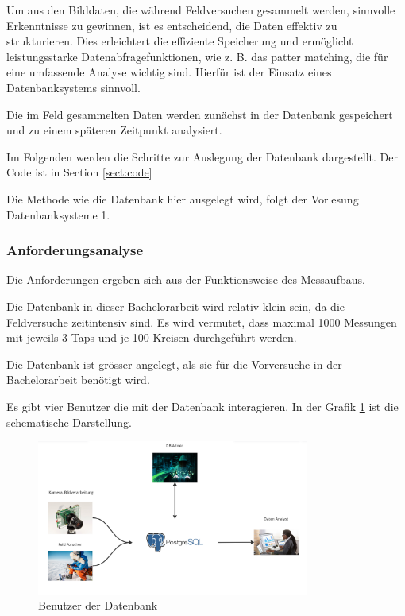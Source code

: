 
Um aus den Bilddaten, die während Feldversuchen gesammelt werden, sinnvolle Erkenntnisse zu gewinnen, ist es entscheidend, die Daten effektiv zu strukturieren. Dies erleichtert die effiziente Speicherung und ermöglicht leistungsstarke Datenabfragefunktionen, wie z. B. das patter matching, die für eine umfassende Analyse wichtig sind. Hierfür ist der Einsatz eines Datenbanksystems sinnvoll.

Die im Feld gesammelten Daten werden zunächst in der Datenbank gespeichert und zu einem späteren Zeitpunkt analysiert.

Im Folgenden werden die Schritte zur Auslegung der Datenbank dargestellt. Der Code ist in Section \ref{sect:code}

Die Methode wie die Datenbank hier ausgelegt wird, folgt der Vorlesung Datenbanksysteme 1. \cite{}

\subsubsection{Anforderungsanalyse}

Die Anforderungen ergeben sich aus der Funktionsweise des Messaufbaus.

Die Datenbank in dieser Bachelorarbeit wird relativ klein sein, da die Feldversuche zeitintensiv sind. Es wird vermutet, dass maximal 1000 Messungen mit jeweils 3 Taps und je 100 Kreisen durchgeführt werden.

Die Datenbank ist grösser angelegt, als sie für die Vorversuche in der Bachelorarbeit benötigt wird.

Es gibt vier Benutzer die mit der Datenbank interagieren. In der Grafik \ref{fig:user-db-entwurf} ist die schematische Darstellung.

\begin{figure}
    \centering
    \includegraphics[width=0.8\textwidth]{Bilder/Screenshotfrom2024-04-0115-26-08.png}
    \caption{Benutzer der Datenbank}
    \label{fig:user-db-entwurf}
\end{figure}

